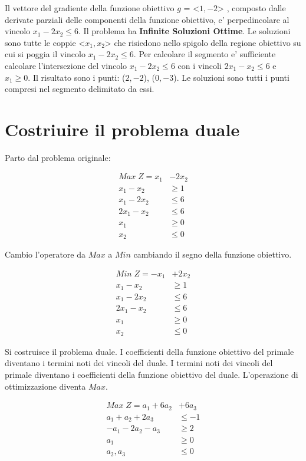 \documentclass[a4paper,12pt,oneside]{article}
\begin{document}
    Il vettore del gradiente della funzione obiettivo $g$ = <$1, -2$> , composto dalle derivate parziali delle componenti della funzione obiettivo, e' perpedincolare al vincolo $x_1 - 2x_2 \leq 6$.
    Il problema ha \textbf{Infinite Soluzioni Ottime}.
    Le soluzioni sono tutte le coppie <$x_1, x_2$> che risiedono nello spigolo della regione obiettivo su cui si poggia il vincolo $x_1 - 2x_2 \leq 6$.
    Per calcolare il segmento e' sufficiente calcolare l'intersezione del vincolo $x_1 - 2x_2 \leq 6$ con i vincoli $2x_1 - x_2 \leq 6$ e $x_1 \geq 0$.
    Il risultato sono i punti: ($2, -2$),  ($0, -3$). Le soluzioni sono tutti i punti compresi nel segmento delimitato da essi.

    \section{Costriuire il problema duale}

    Parto dal problema originale:
    
    \begin{align*}
        Max \; Z = x_1 &- 2 x_2 \\
        x_1 - x_2 & \geq 1 \\
        x_1 - 2 x_2 & \leq 6 \\
        2 x_1 - x_2 & \leq 6 \\
        x_1 & \geq 0 \\
        x_2 & \leq 0
    \end{align*}

    Cambio l'operatore da $Max$ a $Min$ cambiando il segno della funzione obiettivo.

    \begin{align*}
        Min \; Z = -x_1 &+ 2 x_2 \\
        x_1 - x_2 & \geq 1 \\
        x_1 - 2 x_2 & \leq 6 \\
        2 x_1 - x_2 & \leq 6 \\
        x_1 & \geq 0 \\
        x_2 & \leq 0
    \end{align*}

    Si costruisce il problema duale.
    I coefficienti della funzione obiettivo del primale diventano i termini noti dei vincoli del duale.
    I termini noti dei vincoli del primale diventano i coefficienti della funzione obiettivo del duale.
    L'operazione di ottimizzazione diventa $Max$.

    \begin{align*}
        Max \; Z = a_1 + 6 a_2 &+ 6 a_3 \\
        a_1 + a_2 + 2 a_3 &\leq -1 \\
        - a_1 - 2 a_2 - a_3 &\geq 2 \\
        a_1 &\geq 0 \\
        a_2, a_3 &\leq 0
    \end{align*}
\end{document}
